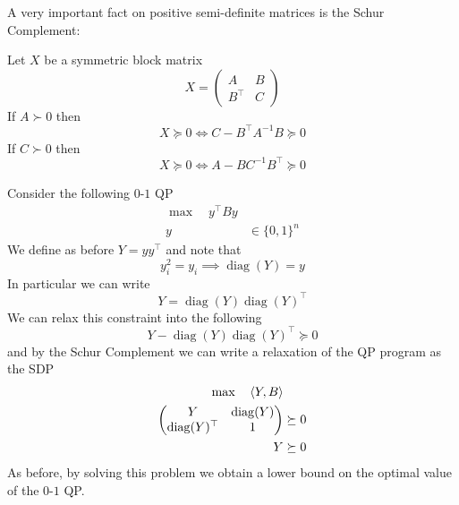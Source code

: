 \documentclass[answers]{exam}
\begin{document}
    A very important fact on positive semi-definite matrices is the Schur Complement: 
    \begin{proposition}
        Let $X$ be a symmetric block matrix 
        $$ X = \begin{pmatrix}
            A & B \\ B^\top & C
        \end{pmatrix} $$
        If $A\succ 0$ then 
        $$ X\succeq 0 \iff C-B^\top A^{-1}B \succeq 0 $$
        If $C\succ 0$ then 
        $$ X\succeq 0 \iff A-B C^{-1}B^\top \succeq 0 $$
    \end{proposition}
    Consider the following $0$-$1$ QP
    \begin{align*}
        \max\quad y^\top B y& \\
        y &\in  \{0,1\}^n
    \end{align*}
    We define as before $Y = y y^\top$ and note that 
    $$ y_i^2 = y_i \implies \operatorname*{diag}(Y) = y $$
    In particular we can write 
    $$ Y = \operatorname*{diag}(Y) \operatorname*{diag}(Y)^\top $$
    We can relax this constraint into the following 
    $$ Y - \operatorname*{diag}(Y) \operatorname*{diag}(Y)^\top \succeq 0 $$
    and by the Schur Complement we can write a relaxation of the QP program as the SDP 
    \begin{align*}
        \max \quad\left\langle Y, B \right\rangle& \\ 
        \begin{pmatrix}
            Y & \operatorname*{diag}(Y) \\ \operatorname*{diag}(Y)^\top & 1
        \end{pmatrix} &\succeq 0 \\ 
        Y&\succeq 0
    \end{align*}
    As before, by solving this problem we obtain a lower bound on the optimal value of the $0$-$1$ QP. \\ 
\end{document}
